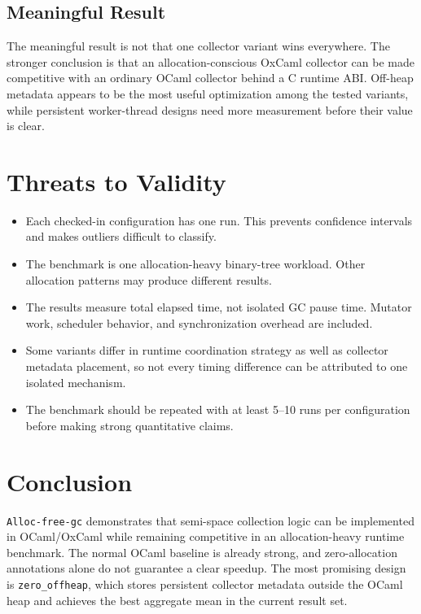 \documentclass[11pt]{article}
\begin{document}
\subsection{Meaningful Result}

The meaningful result is not that one collector variant wins everywhere. The
stronger conclusion is that an allocation-conscious OxCaml collector can be made
competitive with an ordinary OCaml collector behind a C runtime ABI. Off-heap
metadata appears to be the most useful optimization among the tested variants,
while persistent worker-thread designs need more measurement before their value
is clear.

\section{Threats to Validity}

\begin{itemize}
  \item Each checked-in configuration has one run. This prevents confidence
  intervals and makes outliers difficult to classify.
  \item The benchmark is one allocation-heavy binary-tree workload. Other
  allocation patterns may produce different results.
  \item The results measure total elapsed time, not isolated GC pause time.
  Mutator work, scheduler behavior, and synchronization overhead are included.
  \item Some variants differ in runtime coordination strategy as well as
  collector metadata placement, so not every timing difference can be attributed
  to one isolated mechanism.
  \item The benchmark should be repeated with at least 5--10 runs per
  configuration before making strong quantitative claims.
\end{itemize}

\section{Conclusion}

\texttt{Alloc-free-gc} demonstrates that semi-space collection logic can be
implemented in OCaml/OxCaml while remaining competitive in an allocation-heavy
runtime benchmark. The normal OCaml baseline is already strong, and
zero-allocation annotations alone do not guarantee a clear speedup. The most
promising design is \texttt{zero\_offheap}, which stores persistent collector
metadata outside the OCaml heap and achieves the best aggregate mean in the
current result set.
\end{document}
